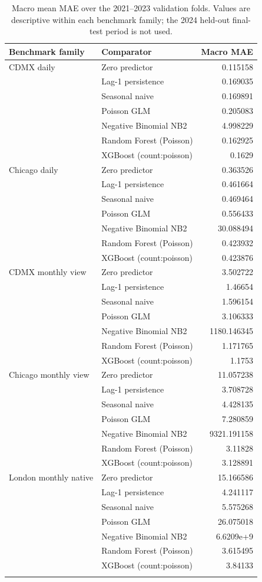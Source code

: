 \begin{table}[!t]
\centering
\caption{Macro mean MAE over the 2021--2023 validation folds. Values are descriptive within each benchmark family; the 2024 held-out final-test period is not used.}
\label{tab:art01-benchmark}
\scriptsize
\begin{tabular}{llr}
\toprule
Benchmark family & Comparator & Macro MAE \\
\midrule
CDMX daily & Zero predictor & 0.115158 \\
 & Lag-1 persistence & 0.169035 \\
 & Seasonal naive & 0.169891 \\
 & Poisson GLM & 0.205083 \\
 & Negative Binomial NB2 & 4.998229 \\
 & Random Forest (Poisson) & 0.162925 \\
 & XGBoost (count:poisson) & 0.1629 \\
\addlinespace
Chicago daily & Zero predictor & 0.363526 \\
 & Lag-1 persistence & 0.461664 \\
 & Seasonal naive & 0.469464 \\
 & Poisson GLM & 0.556433 \\
 & Negative Binomial NB2 & 30.088494 \\
 & Random Forest (Poisson) & 0.423932 \\
 & XGBoost (count:poisson) & 0.423876 \\
\addlinespace
CDMX monthly view & Zero predictor & 3.502722 \\
 & Lag-1 persistence & 1.46654 \\
 & Seasonal naive & 1.596154 \\
 & Poisson GLM & 3.106333 \\
 & Negative Binomial NB2 & 1180.146345 \\
 & Random Forest (Poisson) & 1.171765 \\
 & XGBoost (count:poisson) & 1.1753 \\
\addlinespace
Chicago monthly view & Zero predictor & 11.057238 \\
 & Lag-1 persistence & 3.708728 \\
 & Seasonal naive & 4.428135 \\
 & Poisson GLM & 7.280859 \\
 & Negative Binomial NB2 & 9321.191158 \\
 & Random Forest (Poisson) & 3.11828 \\
 & XGBoost (count:poisson) & 3.128891 \\
\addlinespace
London monthly native & Zero predictor & 15.166586 \\
 & Lag-1 persistence & 4.241117 \\
 & Seasonal naive & 5.575268 \\
 & Poisson GLM & 26.075018 \\
 & Negative Binomial NB2 & 6.6209e+9 \\
 & Random Forest (Poisson) & 3.615495 \\
 & XGBoost (count:poisson) & 3.84133 \\
\addlinespace
\bottomrule
\end{tabular}
\end{table}
